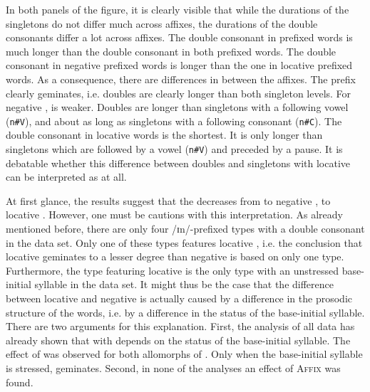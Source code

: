 In both panels of the figure, it is clearly visible that while the durations of the singletons do not differ much across affixes, the durations of the double consonants differ a lot across affixes. The double consonant in prefixed words is much longer than the double consonant in both prefixed words.
The double consonant in negative prefixed words is longer than the one in locative prefixed words. 
As a consequence, there are differences in  between the affixes. 
 The prefix  clearly geminates, i.e. doubles are clearly longer than both singleton levels. 
For negative ,  is weaker. Doubles are longer than singletons with a following vowel (\texttt{n\#V}), and about as long as singletons with a following consonant (\texttt{n\#C}). 
The double consonant in locative words is the shortest. It is only longer than singletons which are followed by a vowel (\texttt{n\#V}) and preceded by a pause. It is debatable whether this difference between doubles and singletons with locative  can be interpreted as  at all.

At first glance, the results suggest that the  decreases from  to negative , to locative .  However, one must be cautions with this interpretation. As already mentioned before, there are only four /ɪn/-prefixed types with a double consonant in the data set. Only one of these types features locative , i.e. the conclusion that locative  geminates to a lesser degree than negative  is based on only one type. Furthermore, the type featuring locative  is the only type with an unstressed base-initial syllable in the data set. 
It might thus be the case that the difference between locative and negative  is actually caused by a difference in the prosodic structure of the words, i.e. by a difference in the  status of the base-initial syllable. There are two arguments for this explanation. First, the analysis of all data has already shown that  with  depends on the  status of the base-initial syllable. The effect of  was observed for both allomorphs of  . Only when the base-initial syllable is stressed,  geminates. 
 Second, in none of the analyses an effect of \textsc{Affix} was found. 


